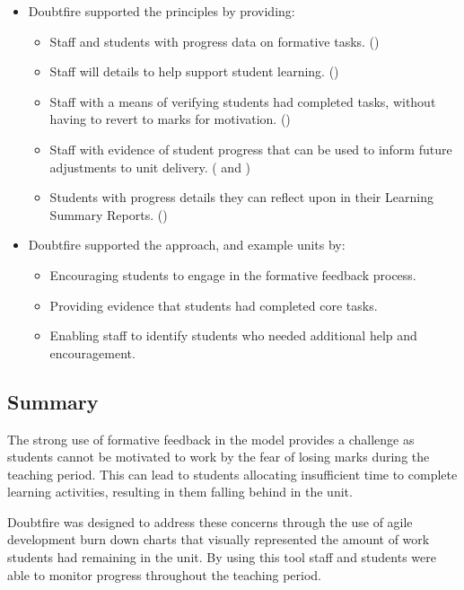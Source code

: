 \begin{itemize}[nolistsep,noitemsep]
  \item Doubtfire supported the principles by providing:
  \begin{itemize}[noitemsep,nolistsep]
    \item Staff and students with progress data on formative tasks. ()
    \item Staff will details to help support student learning. ()
    \item Staff with a means of verifying students had completed tasks, without having to revert to marks for motivation. ()
    \item Staff with evidence of student progress that can be used to inform future adjustments to unit delivery. ( and )
    \item Students with progress details they can reflect upon in their Learning Summary Reports. ()
  \end{itemize}
  \item Doubtfire supported the approach, and example units by:
  \begin{itemize}[noitemsep,nolistsep]
    \item Encouraging students to engage in the formative feedback process.
    \item Providing evidence that students had completed core tasks.
    \item Enabling staff to identify students who needed additional help and encouragement.
  \end{itemize}
\end{itemize}

\subsection{Summary} %
\label{sub:doubtfire_summary}

The strong use of formative feedback in the model provides a challenge as students cannot be motivated to work by the fear of losing marks during the teaching period. This can lead to students allocating insufficient time to complete learning activities, resulting in them falling behind in the unit.

Doubtfire was designed to address these concerns through the use of agile development burn down charts that visually represented the amount of work students had remaining in the unit. By using this tool staff and students were able to monitor progress throughout the teaching period.

